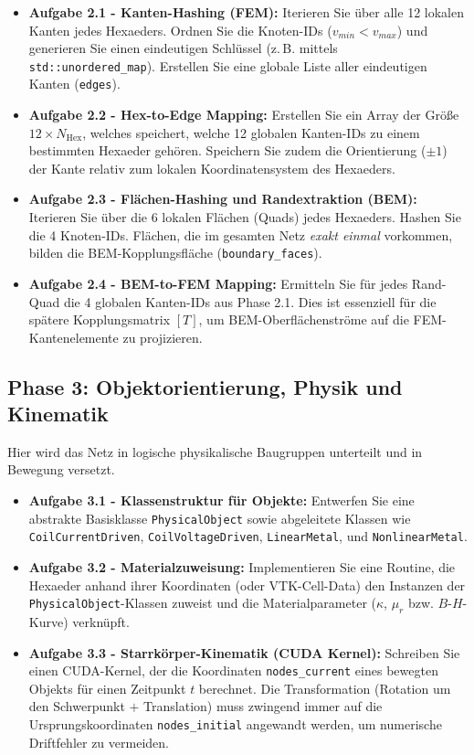 \documentclass[11pt,a4paper]{article}
\begin{document}
\begin{itemize}
    \item \textbf{Aufgabe 2.1 - Kanten-Hashing (FEM):} Iterieren Sie über alle 12 lokalen Kanten jedes Hexaeders. Ordnen Sie die Knoten-IDs ($v_{min} < v_{max}$) und generieren Sie einen eindeutigen Schlüssel (z.\,B. mittels \texttt{std::unordered\_map}). Erstellen Sie eine globale Liste aller eindeutigen Kanten (\texttt{edges}).
    \item \textbf{Aufgabe 2.2 - Hex-to-Edge Mapping:} Erstellen Sie ein Array der Größe $12 \times N_{\text{Hex}}$, welches speichert, welche 12 globalen Kanten-IDs zu einem bestimmten Hexaeder gehören. Speichern Sie zudem die Orientierung ($\pm 1$) der Kante relativ zum lokalen Koordinatensystem des Hexaeders.
    \item \textbf{Aufgabe 2.3 - Flächen-Hashing und Randextraktion (BEM):} Iterieren Sie über die 6 lokalen Flächen (Quads) jedes Hexaeders. Hashen Sie die 4 Knoten-IDs. Flächen, die im gesamten Netz \textit{exakt einmal} vorkommen, bilden die BEM-Kopplungsfläche (\texttt{boundary\_faces}).
    \item \textbf{Aufgabe 2.4 - BEM-to-FEM Mapping:} Ermitteln Sie für jedes Rand-Quad die 4 globalen Kanten-IDs aus Phase 2.1. Dies ist essenziell für die spätere Kopplungsmatrix $[T]$, um BEM-Oberflächenströme auf die FEM-Kantenelemente zu projizieren.
\end{itemize}

\subsection{Phase 3: Objektorientierung, Physik und Kinematik}
Hier wird das Netz in logische physikalische Baugruppen unterteilt und in Bewegung versetzt.

\begin{itemize}
    \item \textbf{Aufgabe 3.1 - Klassenstruktur für Objekte:} Entwerfen Sie eine abstrakte Basisklasse \texttt{PhysicalObject} sowie abgeleitete Klassen wie \texttt{CoilCurrentDriven}, \texttt{CoilVoltageDriven}, \texttt{LinearMetal}, und \texttt{NonlinearMetal}.
    \item \textbf{Aufgabe 3.2 - Materialzuweisung:} Implementieren Sie eine Routine, die Hexaeder anhand ihrer Koordinaten (oder VTK-Cell-Data) den Instanzen der \texttt{PhysicalObject}-Klassen zuweist und die Materialparameter ($\kappa$, $\mu_r$ bzw. $B$-$H$-Kurve) verknüpft.
    \item \textbf{Aufgabe 3.3 - Starrkörper-Kinematik (CUDA Kernel):} Schreiben Sie einen CUDA-Kernel, der die Koordinaten \texttt{nodes\_current} eines bewegten Objekts für einen Zeitpunkt $t$ berechnet. Die Transformation (Rotation um den Schwerpunkt $+$ Translation) muss zwingend immer auf die Ursprungskoordinaten \texttt{nodes\_initial} angewandt werden, um numerische Driftfehler zu vermeiden.
\end{itemize}
\end{document}
